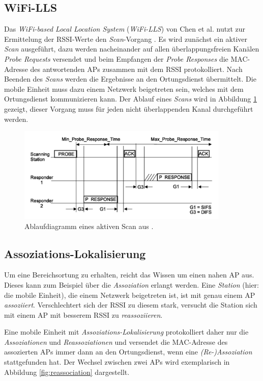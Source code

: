 \subsection{WiFi-LLS}
Das \emph{WiFi-based Local Location System} (\emph{WiFi-LLS}) von Chen et al. nutzt zur Ermittelung der RSSI-Werte den \emph{Scan}-Vorgang \cite{chen2007design}.
Es wird zunächst ein aktiver \emph{Scan} ausgeführt, dazu werden nacheinander auf allen überlappungsfreien Kanälen \emph{Probe Requests} versendet und beim Empfangen der \emph{Probe Responses} die MAC-Adresse des antwortenden APs zusammen mit dem RSSI protokolliert.
Nach Beenden des \emph{Scans} werden die Ergebnisse an den Ortungsdienst übermittelt. 
Die mobile Einheit muss dazu einem Netzwerk beigetreten sein, welches mit dem Ortungsdienst kommunizieren kann.
Der Ablauf eines \emph{Scans} wird in Abbildung \ref{fig:activescan} gezeigt, dieser Vorgang muss für jeden nicht überlappenden Kanal durchgeführt werden.

\begin{figure}[h]
  \centering
	\includegraphics[width=0.9\textwidth]{images/activescan.png}
  \caption{Ablaufdiagramm eines aktiven Scan aus \cite{ieee2012active}.}
  \label{fig:activescan}
\end{figure}

\subsection{Assoziations-Lokalisierung}
Um eine Bereichsortung zu erhalten, reicht das Wissen um einen nahen AP aus.
Dieses kann zum Beispiel über die \emph{Assoziation} erlangt werden.
Eine \emph{Station} (hier: die mobile Einheit), die einem Netzwerk beigetreten ist, ist mit genau einem AP \emph{assoziiert}. 
Verschlechtert sich der RSSI zu diesem stark, versucht die Station sich mit einem AP mit besserem RSSI zu \emph{reassoziieren}.

Eine mobile Einheit mit \emph{Assoziations-Lokalisierung} protokolliert daher nur die \emph{Assoziationen} und \emph{Reassoziationen} und versendet die MAC-Adresse des assozierten APs immer dann an den Ortungsdienst, wenn eine \emph{(Re-)Assoziation} stattgefunden hat.
Der Wechsel zwischen zwei APs wird exemplarisch in Abbildung \ref{fig:reassociation} dargestellt.

